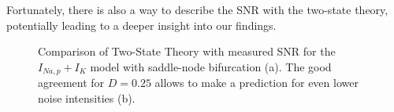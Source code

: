 \documentclass[12pt,a4paper]{article}
\begin{document}
Fortunately, there is also a way to describe the SNR with the two-state theory, potentially leading to a deeper insight into our findings.
\begin{figure}[H]
	\label{neurtst}
	\hspace*{-0.5cm}
	\caption{Comparison of Two-State Theory with measured SNR for the $I_{Na,p}+I_K$ model with saddle-node bifurcation (a). The good agreement for $D=0.25$ allows to make a prediction for even lower noise intensities (b).}
\end{figure}
\end{document}
